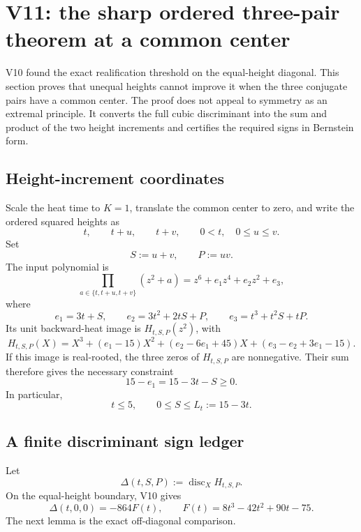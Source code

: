 \documentclass[11pt]{article}
\theoremstyle{definition}
\theoremstyle{remark}
\begin{document}



\section{V11: the sharp ordered three-pair theorem at a common center}
\label{sec:grh-v11}

V10 found the exact realification threshold on the equal-height diagonal.
This section proves that unequal heights cannot improve it when the three
conjugate pairs have a common center.  The proof does not appeal to
symmetry as an extremal principle.  It converts the full cubic
discriminant into the sum and product of the two height increments and
certifies the required signs in Bernstein form.

\subsection{Height-increment coordinates}

Scale the heat time to \(K=1\), translate the common center to zero, and
write the ordered squared heights as
\[
 t,\qquad t+u,\qquad t+v,
 \qquad 0<t,\quad 0\le u\le v.
 \tag{N11.1}
\]
Set
\[
 S:=u+v,\qquad P:=uv.
 \tag{N11.2}
\]
The input polynomial is
\[
 \prod_{a\in\{t,t+u,t+v\}}(z^2+a)
 =z^6+e_1z^4+e_2z^2+e_3,
 \tag{N11.3}
\]
where
\[
 e_1=3t+S,\qquad
 e_2=3t^2+2tS+P,\qquad
 e_3=t^3+t^2S+tP.
 \tag{N11.4}
\]
Its unit backward-heat image is \(H_{t,S,P}(z^2)\), with
\[
 H_{t,S,P}(X)
 =X^3+(e_1-15)X^2+(e_2-6e_1+45)X
   +(e_3-e_2+3e_1-15).
 \tag{N11.5}
\]
If this image is real-rooted, the three zeros of \(H_{t,S,P}\) are
nonnegative.  Their sum therefore gives the necessary constraint
\[
 15-e_1=15-3t-S\ge0.
 \tag{N11.6}
\]
In particular,
\[
 t\le5,\qquad 0\le S\le L_t:=15-3t.
 \tag{N11.7}
\]

\subsection{A finite discriminant sign ledger}

Let
\[
 \Delta(t,S,P):=\operatorname{disc}_X H_{t,S,P}.
 \tag{N11.8}
\]
On the equal-height boundary, V10 gives
\[
 \Delta(t,0,0)=-864F(t),
 \qquad
 F(t)=8t^3-42t^2+90t-75.
 \tag{N11.9}
\]
The next lemma is the exact off-diagonal comparison.
\end{document}
